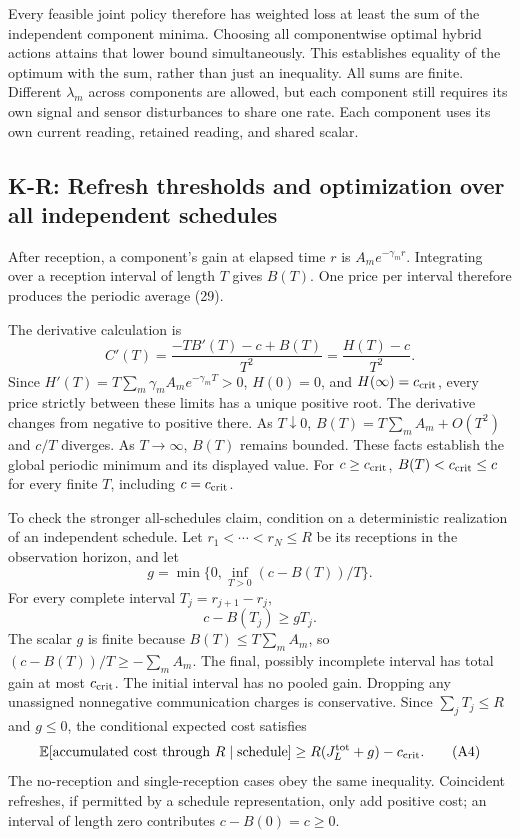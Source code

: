 \documentclass[11pt,letterpaper]{article}
\newcommand{\E}{\mathbb E}
\newcommand{\calculation}[2]{\subsection{#1: #2}}
\begin{document}
Every feasible joint policy therefore has weighted loss at least the sum of the independent component minima. Choosing all componentwise optimal hybrid actions attains that lower bound simultaneously. This establishes equality of the optimum with the sum, rather than just an inequality. All sums are finite. Different $\lambda_m$ across components are allowed, but each component still requires its own signal and sensor disturbances to share one rate. Each component uses its own current reading, retained reading, and shared scalar.

\calculation{K-R}{Refresh thresholds and optimization over all independent schedules}
After reception, a component's gain at elapsed time $r$ is $A_m e^{-\gamma_m r}$. Integrating over a reception interval of length $T$ gives $B(T)$. One price per interval therefore produces the periodic average (29).

The derivative calculation is
\[
C'(T)=\frac{-TB'(T)-c+B(T)}{T^2}
=\frac{H(T)-c}{T^2}.
\]
Since $H'(T)=T\sum_m\gamma_m A_m e^{-\gamma_mT}>0$,
$H(0)=0$, and $H(\infty)=c_{\rm crit}$, every price strictly between these limits has a unique positive root. The derivative changes from negative to positive there. As $T\downarrow0$, $B(T)=T\sum_m A_m+O(T^2)$ and $c/T$ diverges. As $T\to\infty$, $B(T)$ remains bounded. These facts establish the global periodic minimum and its displayed value. For $c\ge c_{\rm crit}$, $B(T)<c_{\rm crit}\le c$ for every finite $T$, including $c=c_{\rm crit}$.

To check the stronger all-schedules claim, condition on a deterministic realization of an independent schedule. Let $r_1<\cdots<r_N\le R$ be its receptions in the observation horizon, and let
\[
g=\min\{0,\inf_{T>0}(c-B(T))/T\}.
\]
For every complete interval $T_j=r_{j+1}-r_j$,
\[
c-B(T_j)\ge gT_j.
\]
The scalar $g$ is finite because $B(T)\le T\sum_m A_m$, so $(c-B(T))/T\ge-\sum_m A_m$.
The final, possibly incomplete interval has total gain at most $c_{\rm crit}$. The initial interval has no pooled gain. Dropping any unassigned nonnegative communication charges is conservative. Since $\sum_jT_j\le R$ and $g\le0$, the conditional expected cost satisfies
\begin{equation}
\E[\text{accumulated cost through }R\mid\text{schedule}]
\ge R(J_L^{\rm tot}+g)-c_{\rm crit}.
\tag{A4}
\end{equation}
The no-reception and single-reception cases obey the same inequality. Coincident refreshes, if permitted by a schedule representation, only add positive cost; an interval of length zero contributes $c-B(0)=c\ge0$.
\end{document}
